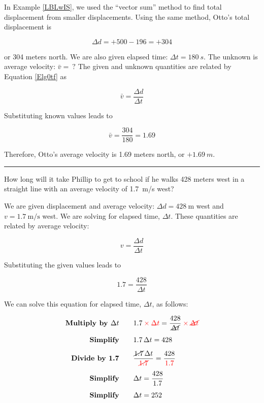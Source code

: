 \documentclass{article}
\begin{document}
 In Example \ref{LBLwIS}, we used the ``vector sum'' method to find total displacement from smaller displacements. Using the same method, Otto's total displacement is

\begin{equation*}
    \Delta{d} = +500 - 196 = +304
\end{equation*}

or 304 meters north. We are also given elapsed time: $\Delta{t} = \SI{180}{s}$. The unknown is average velocity: $\bar{v} =\ ?$ The given and unknown quantities are related by Equation \eqref{Elg0tf} as

\begin{equation*}
    \bar{v} = \frac{\Delta{d}}{\Delta{t}}
\end{equation*}

Substituting known values leads to 

\begin{equation*}
    \bar{v} = \frac{304}{180} = 1.69
\end{equation*}

Therefore, Otto's average velocity is 1.69 meters north, or $+\SI{1.69}{m}$.

\hrule


\begin{example}
    How long will it take Phillip to get to school if he walks 428 meters west in a straight line with an average velocity of \SI{1.7}{m/s} west?
\end{example}

 We are given displacement and average velocity: $\Delta{d} = \SI{428}{\meter}$ west and $v = \SI{1.7}{\meter/\second}$ west. We are solving for elapsed time, $\Delta t$. These quantities are related by average velocity:

\begin{equation*}
    v = \frac{\Delta d}{\Delta t}
\end{equation*}

Substituting the given values leads to

\begin{equation*}
    1.7 = \frac{428}{\Delta t}
\end{equation*}

We can solve this equation for elapsed time, $\Delta t$, as follows:

\begin{align*}
    \textbf{Multiply by $\Delta t$} \qquad & 1.7 \mathbin{\color{red} \times} \textcolor{red}{\Delta t} = \frac{428}{\cancel{\Delta t}} \mathbin{\color{red} \times} \textcolor{red}{\cancel{\Delta t}}\\[1ex]
    \textbf{Simplify} \qquad & 1.7\, \Delta t = 428\\[1ex]
    \textbf{Divide by 1.7} \qquad & \frac{\cancel{1.7}\, \Delta t}{\textcolor{red}{\cancel{1.7}}} = \frac{428}{\textcolor{red}{1.7}}\\[1ex]
    \textbf{Simplify} \qquad & \Delta{t} = \frac{428}{1.7}\\[1ex]
    \textbf{Simplify} \qquad & \Delta t = 252
\end{align*}
\end{document}
